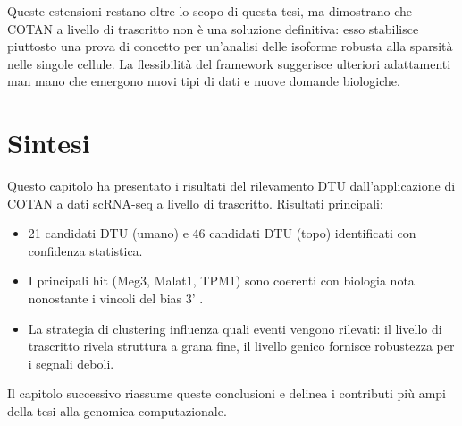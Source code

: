 Queste estensioni restano oltre lo scopo di questa tesi, ma dimostrano che COTAN a livello di trascritto non è una soluzione definitiva: esso stabilisce piuttosto una prova di concetto per un'analisi delle isoforme robusta alla sparsità nelle singole cellule. La flessibilità del framework suggerisce ulteriori adattamenti man mano che emergono nuovi tipi di dati e nuove domande biologiche.

\section*{Sintesi}

Questo capitolo ha presentato i risultati del rilevamento DTU dall'applicazione di COTAN a dati scRNA-seq a livello di trascritto. Risultati principali:
\begin{itemize}
    \item 21 candidati DTU (umano) e 46 candidati DTU (topo) identificati con confidenza statistica.
    \item I principali hit (Meg3, Malat1, TPM1) sono coerenti con biologia nota nonostante i vincoli del bias 3' \cite{ghanam2023malat1, xue2012specialized}.
    \item La strategia di clustering influenza quali eventi vengono rilevati: il livello di trascritto rivela struttura a grana fine, il livello genico fornisce robustezza per i segnali deboli.
\end{itemize}

Il capitolo successivo riassume queste conclusioni e delinea i contributi più ampi della tesi alla genomica computazionale.
